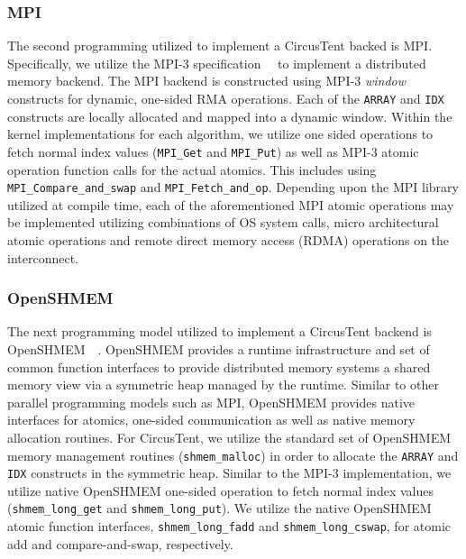 \subsubsection{MPI}
\label{subsubsec:mpi}

The second programming utilized to implement a CircusTent backed is MPI.  
Specifically, we utilize the MPI-3
specification~\cite{mpi-3.0}~\cite{10.1007/978-3-642-33518-1_1} to 
implement a distributed 
memory backend.  The MPI backend is constructed using MPI-3 \textit{window} 
constructs for dynamic, one-sided RMA operations.  Each of the \texttt{ARRAY} 
and \texttt{IDX} constructs are locally allocated and mapped into a dynamic 
window.  Within the kernel implementations for each algorithm, we utilize 
one sided operations to fetch normal index values 
(\texttt{MPI\_Get} and \texttt{MPI\_Put}) as well as MPI-3 atomic 
operation function calls for the actual atomics.  This includes 
using \texttt{MPI\_Compare\_and\_swap} and \texttt{MPI\_Fetch\_and\_op}.  
Depending upon the MPI library utilized at compile time, each of 
the aforementioned MPI atomic operations may be implemented 
utilizing combinations of OS system calls, micro architectural atomic 
operations and remote direct memory access (RDMA) operations on the interconnect.  

\subsubsection{OpenSHMEM}
\label{subsubsec:openshmem}

The next programming model utilized to implement a CircusTent backend is 
OpenSHMEM~\cite{openshmemspec}~\cite{Poole2011}.  OpenSHMEM provides a runtime 
infrastructure and set of common function interfaces to provide distributed 
memory systems a shared memory view via a symmetric heap managed by the runtime.  
Similar to other parallel programming models such as MPI, OpenSHMEM provides 
native interfaces for atomics, one-sided communication as well as native 
memory allocation routines.  For CircusTent, we utilize the standard set 
of OpenSHMEM memory management routines (\texttt{shmem\_malloc}) in order to
allocate the \texttt{ARRAY} and \texttt{IDX} constructs in the symmetric heap.  
Similar to the MPI-3 implementation, we utilize native OpenSHMEM one-sided 
operation to fetch normal index values (\texttt{shmem\_long\_get} 
and \texttt{shmem\_long\_put}).  We utilize the native OpenSHMEM 
atomic function interfaces, \texttt{shmem\_long\_fadd} and 
\texttt{shmem\_long\_cswap}, for atomic add and compare-and-swap, 
respectively.  

